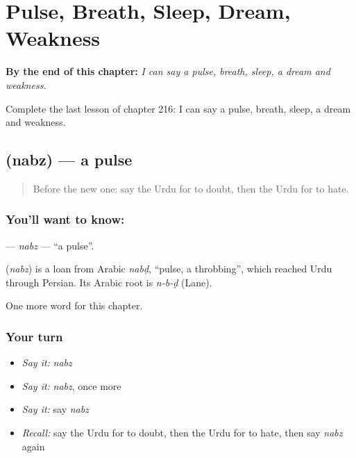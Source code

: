 
\chapter{Pulse, Breath, Sleep, Dream, Weakness}
\label{ch:ur-pulse-breath-sleep-dream-weakness}

\begin{chapteropening}
\textbf{By the end of this chapter:} \emph{I can say a pulse, breath, sleep, a dream and weakness.}

Complete the last lesson of chapter 216: I can say a pulse, breath, sleep, a dream and weakness.
\end{chapteropening}

\section[\texorpdfstring{\ur{نبض} (nabz)}{نبض (nabz)}]{ (nabz) — a pulse}

\label{lesson:UR-C216-nabz}



\begin{quote}
Before the new one: say the Urdu for to doubt, then the Urdu for to hate.
\end{quote}

\subsection*{You'll want to know: }
\textbf{} — \emph{nabz} — \textquotedblleft{}a pulse\textquotedblright{}.

\begin{cousinweb}
\textbf{} (\emph{nabz}) is a loan from Arabic \emph{nabḍ}, \textquotedblleft{}pulse, a throbbing\textquotedblright{}, which reached Urdu through Persian. Its Arabic root is \emph{n-b-ḍ} (Lane).
\end{cousinweb}

\begin{grammarlens}[title={What you've built}]
One more word for this chapter.
\end{grammarlens}

\subsection*{Your turn}
\begin{itemize}
\raggedright
  \item \emph{Say it:} \emph{nabz}
  \item \emph{Say it:} \emph{nabz}, once more
  \item \emph{Say it:} say \emph{nabz}
  \item \emph{Recall:} say the Urdu for to doubt, then the Urdu for to hate, then say \emph{nabz} again
\end{itemize}


